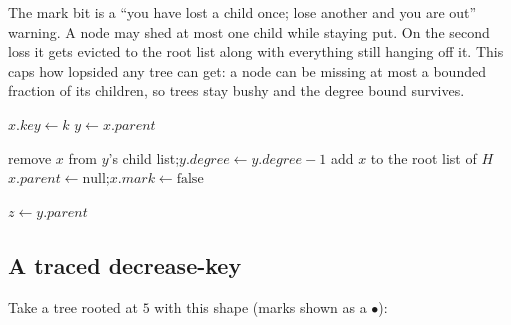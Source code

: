 \begin{intuitionbox}
The mark bit is a ``you have lost a child once; lose another and you are out''
warning. A node may shed at most one child while staying put. On the second loss it
gets evicted to the root list along with everything still hanging off it. This caps
how lopsided any tree can get: a node can be missing at most a bounded fraction of
its children, so trees stay bushy and the degree bound survives.
\end{intuitionbox}

\begin{algorithm}[H]
\caption{\textsc{FibHeap-Decrease-Key}($H$, $x$, $k$)}
$x.\mathit{key} \gets k$\;
$y \gets x.\mathit{parent}$\;
\end{algorithm}

\begin{algorithm}[H]
\caption{\textsc{Cut}($H$, $x$, $y$)}
remove $x$ from $y$'s child list;\quad $y.\mathit{degree} \gets y.\mathit{degree}-1$\;
add $x$ to the root list of $H$\;
$x.\mathit{parent} \gets \text{null}$;\quad $x.\mathit{mark} \gets \text{false}$\;
\end{algorithm}

\begin{algorithm}[H]
\caption{\textsc{Cascading-Cut}($H$, $y$)}
$z \gets y.\mathit{parent}$\;
\end{algorithm}

\subsection{A traced decrease-key}

Take a tree rooted at $5$ with this shape (marks shown as a $\bullet$):

\begin{center}
\end{center}

